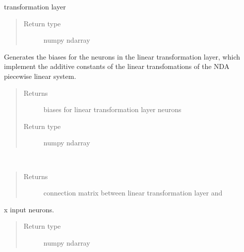 \documentclass[letterpaper,10pt,english]{sphinxmanual}
\begin{document}
\begin{fulllineitems}
\begin{fulllineitems}
\begin{quote}
\begin{description}
\end{description}\end{quote}

transformation layer
\begin{quote}\begin{description}
\item[{Return type}] \leavevmode
numpy ndarray

\end{description}\end{quote}

\end{fulllineitems}


\begin{fulllineitems}
\label{neuraltm_docs:neuraltm.NeuralTM.LTL_biases_from_params}
Generates the biases for the neurons in the linear transformation
layer, which implement the additive constants of the linear
transfomations of the NDA piecewise linear system.
\begin{quote}\begin{description}
\item[{Returns}] \leavevmode
biases for linear transformation layer neurons

\item[{Return type}] \leavevmode
numpy ndarray

\end{description}\end{quote}

\end{fulllineitems}


\begin{fulllineitems}
\label{neuraltm_docs:neuraltm.NeuralTM.cn_LTL_MCLx}~\begin{quote}\begin{description}
\item[{Returns}] \leavevmode
connection matrix between linear transformation layer and

\end{description}\end{quote}

x input neurons.
\begin{quote}\begin{description}
\item[{Return type}] \leavevmode
numpy ndarray


\end{description}
\end{quote}
\end{fulllineitems}
\end{fulllineitems}
\end{document}
